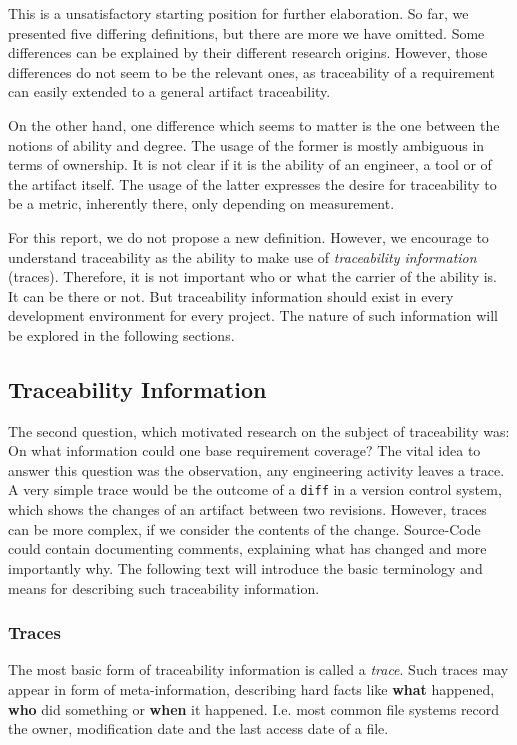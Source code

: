 \documentclass[runningheads,a4paper]{llncs}
\begin{document}
This is a unsatisfactory starting position for further elaboration.
So far, we presented five differing definitions, but there are more we have omitted.
Some differences can be explained by their different research origins.
However, those differences do not seem to be the relevant ones, as traceability of a requirement can easily extended to a general artifact traceability.

On the other hand, one difference which seems to matter is the one between the notions of ability and degree.
The usage of the former is mostly ambiguous in terms of ownership.
It is not clear if it is the ability of an engineer, a tool or of the artifact itself.
The usage of the latter expresses the desire for traceability to be a metric, inherently there, only depending on measurement.

For this report, we do not propose a new definition. 
However, we encourage to understand traceability as the ability to make use of \textit{traceability information} (traces).
Therefore, it is not important who or what the carrier of the ability is.
It can be there or not.
But traceability information should exist in every development environment for every project.
The nature of such information will be explored in the following sections.

\subsection{Traceability Information}
\label{subsec:Traceability-Information}
The second question, which motivated research on the subject of traceability was:
On what information could one base requirement coverage?
The vital idea to answer this question was the observation, any engineering activity leaves a trace.
A very simple trace would be the outcome of a \texttt{diff} in a version control system, which shows the changes of an artifact between two revisions.
However, traces can be more complex, if we consider the contents of the change. 
Source-Code could contain documenting comments, explaining what has changed and more importantly why.
The following text will introduce the basic terminology and means for describing such traceability information.


\subsubsection{Traces}
\label{subsubsec:Traces}
The most basic form of traceability information is called a \textit{trace}. 
Such traces may appear in form of meta-information, describing hard facts like \textbf{what} happened, \textbf{who} did something or \textbf{when} it happened. 
I.e. most common file systems record the owner, modification date and the last access date of a file.
\end{document}
